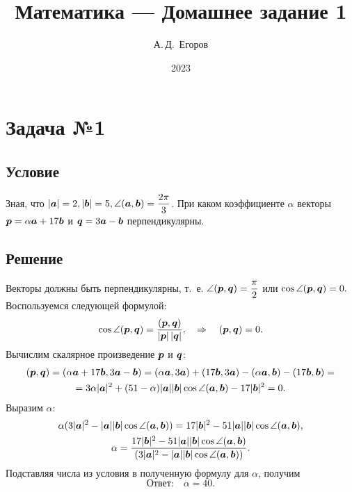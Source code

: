 \documentclass[12pt, a4paper]{article}
\title{Математика --- Домашнее задание 1}
\author{А.\,Д.~Егоров}
\date{2023}
\renewcommand{\vec}[1]{\text{\mathversion{bold}${#1}$}}%
\begin{document}
	
	\maketitle
	\tableofcontents
	\pagebreak
	
	\section{Задача №1}
	
		\subsection*{Условие}
		
			Зная, что $|\vec{a}| = 2, |\vec{b}| = 5, \angle{ \left( \vec{a}, \vec{b}\right) } = \dfrac{2\pi}{3}$. При каком коэффициенте $\alpha$ векторы $\vec{p} = \alpha \vec{a} + 17 \vec{b}$ и $\vec{q} = 3 \vec{a} - \vec{b}$ перпендикулярны.
		
		\subsection*{Решение}
			Векторы должны быть перпендикулярны, т.~е.
			$
			\angle(\vec{p}, \vec{q}) = \dfrac{\pi}{2}
			$
			или 		
			$
				\cos \angle(\vec{p}, \vec{q}) = 0.
			$
			Воспользуемся следующей формулой:
			\begin{equation*}
				\label{cos}
				\cos \angle(\vec{p}, \vec{q}) = 
				\dfrac{\left( \vec{p}, \vec{q} \right)}{|\vec{p}| \, |\vec{q}|},
				\quad
				\Rightarrow \quad ( \vec{p}, \vec{q} ) = 0.
			\end{equation*}
			Вычислим скалярное произведение $\vec{p}$ и $\vec{q}$:
			\begin{gather*}
				( \vec{p}, \vec{q} ) = 
				(\alpha \vec{a} + 17 \vec{b}, 3 \vec{a} - \vec{b}) = 
				(\alpha \vec{a}, 3 \vec{a}) + (17 \vec{b}, 3 \vec{a}) - (\alpha \vec{a}, \vec{b}) - (17 \vec{b},  \vec{b}) = \\
				= 3 \alpha |\vec{a}|^2 + (51 - \alpha) 
				|\vec a| |\vec b| \cos \angle(\vec{a}, \vec{b}) - 17 |\vec b|^2 = 0.
			\end{gather*}
			Выразим $\alpha$:
			\begin{gather*}
				\alpha (3 |\vec a|^2 - |\vec a| |\vec b| \cos \angle(\vec{a}, \vec{b}) ) =
				17 |\vec b|^2 - 51 |\vec a| |\vec b| \cos \angle(\vec{a}, \vec{b}),
				\\
				\alpha =
				\dfrac{17 |\vec b|^2 - 51 |\vec a| |\vec b| \cos \angle(\vec{a}, \vec{b})}{(3 |\vec a|^2 - |\vec a| |\vec b| \cos \angle(\vec{a}, \vec{b}) )}.
			\end{gather*}
			Подставляя числа из условия в полученную формулу для $\alpha$, получим
			$$
			\text{Ответ:} \quad \alpha = 40.
			$$
		
\end{document}
